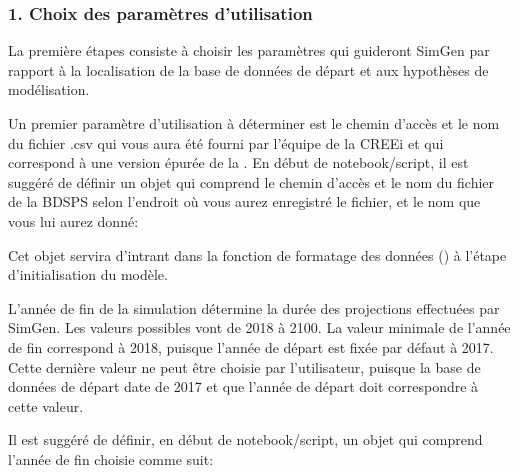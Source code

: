 \documentclass[letterpaper,10pt,french]{sphinxmanual}
\begin{document}
\subsubsection{1. Choix des paramètres d’utilisation}
\label{\detokenize{utilisation:choix-des-parametres-d-utilisation}}
La première étapes consiste à choisir les paramètres qui guideront SimGen par rapport à la localisation de la base de données de départ et
aux hypothèses de modélisation.


Un premier paramètre d’utilisation à déterminer est le chemin d’accès et le nom du fichier .csv
qui vous aura été fourni par l’équipe de la CREEi et qui correspond à une version épurée de
la .
En début de notebook/script, il est suggéré de définir un objet qui comprend le chemin d’accès et le nom du fichier
de la BDSPS selon l’endroit où vous aurez enregistré le fichier, et le nom que vous lui aurez donné:

\begin{sphinxVerbatim}[commandchars=\\\{\}]
  
\end{sphinxVerbatim}

Cet objet servira d’intrant dans la fonction de formatage des données () à l’étape d’initialisation du modèle.


L’année de fin de la simulation détermine la durée des projections effectuées par SimGen. Les valeurs possibles vont de 2018 à 2100.
La valeur minimale de l’année de fin correspond à 2018, puisque l’année de départ est fixée par défaut à 2017.
Cette dernière valeur ne peut être choisie par l’utilisateur, puisque la base de données de départ date de 2017 et que l’année de départ doit correspondre à cette valeur.

Il est suggéré de définir, en début de notebook/script, un objet qui comprend l’année de fin choisie comme suit:

\begin{sphinxVerbatim}[commandchars=\\\{\}]
  
\end{sphinxVerbatim}
\end{document}
